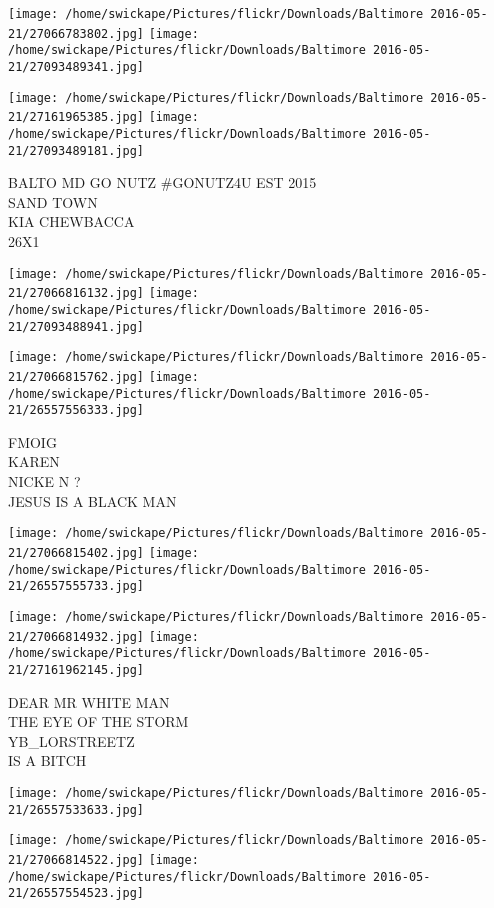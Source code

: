 \documentclass[10pt,letterpaper]{article}
\begin{document}
\texttt{[image: /home/swickape/Pictures/flickr/Downloads/Baltimore 2016-05-21/27066783802.jpg]}
\texttt{[image: /home/swickape/Pictures/flickr/Downloads/Baltimore 2016-05-21/27093489341.jpg]}

\texttt{[image: /home/swickape/Pictures/flickr/Downloads/Baltimore 2016-05-21/27161965385.jpg]}
\texttt{[image: /home/swickape/Pictures/flickr/Downloads/Baltimore 2016-05-21/27093489181.jpg]}

BALTO MD GO NUTZ \#GONUTZ4U EST 2015\\
SAND TOWN\\
KIA CHEWBACCA\\
26X1\\
\pagebreak

\texttt{[image: /home/swickape/Pictures/flickr/Downloads/Baltimore 2016-05-21/27066816132.jpg]}
\texttt{[image: /home/swickape/Pictures/flickr/Downloads/Baltimore 2016-05-21/27093488941.jpg]}

\texttt{[image: /home/swickape/Pictures/flickr/Downloads/Baltimore 2016-05-21/27066815762.jpg]}
\texttt{[image: /home/swickape/Pictures/flickr/Downloads/Baltimore 2016-05-21/26557556333.jpg]}

FMOIG\\
KAREN\\
NICKE N ?\\
JESUS IS A BLACK MAN\\
\pagebreak

\texttt{[image: /home/swickape/Pictures/flickr/Downloads/Baltimore 2016-05-21/27066815402.jpg]}
\texttt{[image: /home/swickape/Pictures/flickr/Downloads/Baltimore 2016-05-21/26557555733.jpg]}

\texttt{[image: /home/swickape/Pictures/flickr/Downloads/Baltimore 2016-05-21/27066814932.jpg]}
\texttt{[image: /home/swickape/Pictures/flickr/Downloads/Baltimore 2016-05-21/27161962145.jpg]}

DEAR MR WHITE MAN\\
THE EYE OF THE STORM\\
YB\_LORSTREETZ\\
IS A BITCH\\
\pagebreak

\texttt{[image: /home/swickape/Pictures/flickr/Downloads/Baltimore 2016-05-21/26557533633.jpg]}

\vspace{0.25in}
\texttt{[image: /home/swickape/Pictures/flickr/Downloads/Baltimore 2016-05-21/27066814522.jpg]}
\texttt{[image: /home/swickape/Pictures/flickr/Downloads/Baltimore 2016-05-21/26557554523.jpg]}
\end{document}
